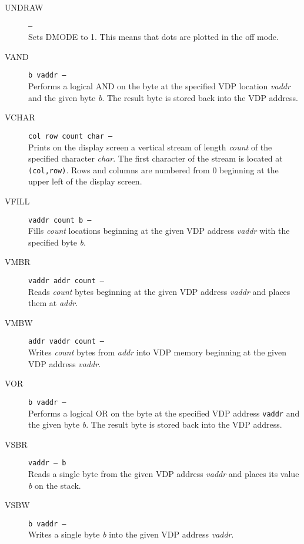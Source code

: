 \documentclass{article}
\begin{document}
\begin{multicols}{2}[]
\begin{description}
			\item[UNDRAW]\texttt{--- }\\
				Sets DMODE to 1. This means that dots are plotted in the off mode.

			\item[VAND]\texttt{b vaddr --- }\\
				Performs a logical AND on the byte at the specified VDP location
				\textit{vaddr} and the given byte \textit{b}. The result byte is
				stored back into the VDP address.

			\item[VCHAR]\texttt{col row count char --- }\\
				Prints on the display screen a vertical stream of length \textit{count}
				of the specified character \textit{char}. The first character of the
				stream is located at \verb|(col,row)|. Rows and columns are numbered
				from 0 beginning at the upper left of the display screen.

			\item[VFILL]\texttt{vaddr count b --- }\\
				Fills \textit{count} locations beginning at the given VDP address
				\textit{vaddr} with the specified byte \textit{b}.

			\item[VMBR]\texttt{vaddr addr count --- }\\
				Reads \textit{count} bytes beginning at the given VDP address
				\textit{vaddr} and places them at \textit{addr}.

			\item[VMBW]\texttt{addr vaddr count --- }\\
				Writes \textit{count} bytes from \textit{addr} into VDP memory
				beginning at the given VDP address \textit{vaddr}.

			\item[VOR]\texttt{b vaddr --- }\\
				Performs a logical OR on the byte at the specified VDP address
				\verb|vaddr| and the given byte \textit{b}. The result byte is stored
				back into the VDP address.

			\item[VSBR]\texttt{vaddr --- b }\\
				Reads a single byte from the given VDP address \textit{vaddr} and places
				its value \textit{b} on the stack.

			\item[VSBW]\texttt{b vaddr --- }\\
				Writes a single byte \textit{b} into the given VDP address \textit{vaddr}.


\end{description}
\end{multicols}
\end{document}
